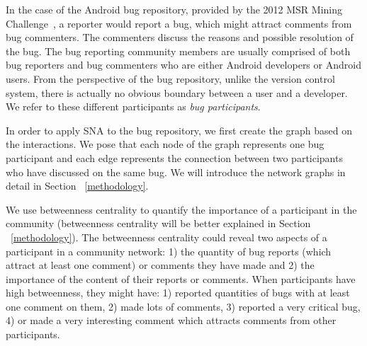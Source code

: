 \documentclass[conference]{IEEEtran}
\begin{document}

In the case of the Android bug repository, provided by the 2012 MSR
Mining Challenge~\cite{DATA:msr}, a reporter would report a bug, which
might attract comments from bug commenters. The commenters discuss the
reasons and possible resolution of the bug.
The bug reporting community members are usually comprised of both bug
reporters and bug commenters who are either Android developers or
Android users.
From the perspective of the bug repository, unlike the version control
system, there is actually no
obvious boundary between a user and a developer.
We refer to these different participants as \emph{bug participants}.

In order to apply SNA to the bug repository, we first create the graph based on the interactions. 
We pose that each node of the graph represents
one bug participant and each edge represents the connection between
two participants who have discussed on the same bug. 
We will introduce the network graphs in detail in
Section ~\ref{methodology}.

We use betweenness centrality to quantify the importance of a
participant in the community \cite{ICSEsocio:la} 
(betweenness centrality will be better explained in 
 Section ~\ref{methodology}).
The betweenness centrality could reveal two aspects of a participant
in a community network: 1) the quantity of bug reports (which attract
at least one comment) or comments they have made and 2) the importance
of the content of their reports or comments. 
When participants have high betweenness, they might have: 1) reported
quantities of bugs with at least one comment on them, 2) made lots of
comments, 3) reported a very critical bug, 4) or made a very
interesting comment which attracts comments from other participants.


\end{document}
